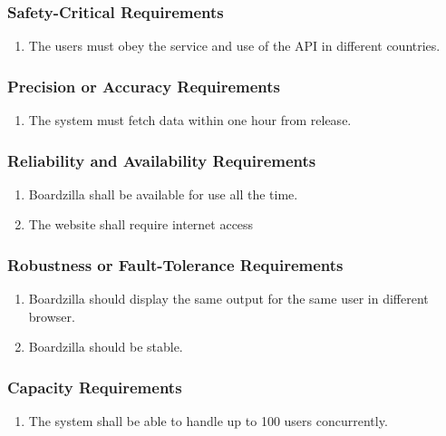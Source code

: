 \documentclass[]{article}
\begin{document}
\subsubsection{Safety-Critical Requirements}
\label{ssub:safety_critical_requirements}
\begin{enumerate}[{PR}1. ]
  \item The users must obey the service and use of the API in different countries. 
\end{enumerate}

\subsubsection{Precision or Accuracy Requirements}
\label{ssub:precision_or_accuracy_requirements}
\begin{enumerate}[{PR}1. ]
  \item The system must fetch data within one hour from release.
\end{enumerate}

\subsubsection{Reliability and Availability Requirements}
\label{ssub:reliability_and_availability_requirements}
\begin{enumerate}[{PR}1. ]
  \item Boardzilla shall be available for use all the time.
  \item The website shall require internet access
\end{enumerate}

\subsubsection{Robustness or Fault-Tolerance Requirements}
\label{ssub:robustness_or_fault_tolerance_requirements}
\begin{enumerate}[{PR}1. ]
  \item Boardzilla should display the same output for the same user in different browser. 
  \item Boardzilla should be stable. 
\end{enumerate}

\subsubsection{Capacity Requirements}
\label{ssub:capacity_requirements}
\begin{enumerate}[{PR}1. ]
  \item The system shall be able to handle up to 100 users concurrently.
\end{enumerate}
\end{document}
